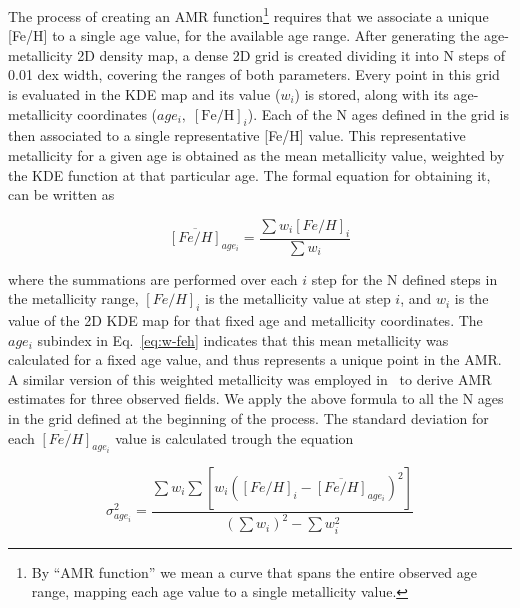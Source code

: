 \documentclass{aa}
\begin{document}
\begin{appendix}
The process of creating an AMR function\footnote{By ``AMR function'' we mean a
curve that spans the entire observed age range, mapping each age value
to a single metallicity value.} requires that we associate a unique [Fe/H] to a
single age value, for the available age range.
%
After generating the age-metallicity 2D density map, a dense 2D grid is created
dividing it into N steps of 0.01 dex width, covering the ranges of both
parameters. Every point in this grid is evaluated in the KDE map and its value 
($w_{i}$) is stored, along with its age-metallicity coordinates
($age_{i},\;[\mathrm{Fe/H}]_{i}$).
Each of the N ages defined in the grid is then associated to a single
representative [Fe/H] value. This representative metallicity for a given age is
obtained as the mean metallicity value, weighted by the KDE function at that
particular age. The formal equation for obtaining it, can be written as

\begin{equation}
\overline{[Fe/H]}_{age_i}=\frac{\sum w_i {[Fe/H]}_i}{\sum w_i}
\label{eq:w-feh}
\end{equation}

\noindent where the summations are performed over each $i$ step for the N
defined steps in the metallicity range, ${[Fe/H]}_i$ is the metallicity value
at step $i$, and $w_i$ is the value of the 2D KDE map for that fixed age and
metallicity coordinates.
The $age_i$ subindex in Eq.~\ref{eq:w-feh} indicates that this mean
metallicity was calculated for a fixed age value, and thus represents a unique
point in the AMR.\@
A similar version of this weighted metallicity was employed 
in~\citet[][see Eq. 3]{Noel_2009} to derive AMR estimates for three observed
fields.
We apply the above formula to all the N ages in the grid defined at the
beginning of the process. The standard deviation for each $\overline{[Fe/H]}_
{age_i}$ value is calculated trough the equation

\begin{equation}
\sigma_{age_i}^2=\frac{\sum w_i \sum [w_i {({[Fe/H]}_i -
\overline{[Fe/H]}_{age_i})}^2]}{{(\sum w_i)}^2 - \sum w_i^2}
\label{eq:w-std-dev}
\end{equation}


\end{appendix}
\end{document}
